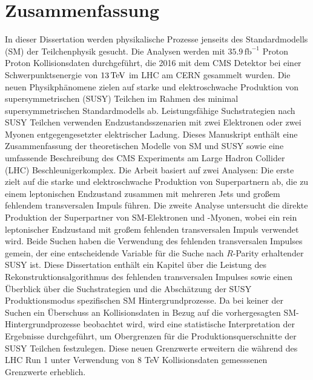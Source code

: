 \chapter*{Zusammenfassung}
\noindent
\justify
In dieser Dissertation werden physikalische Prozesse jenseits des Standardmodells (SM) der Teilchenphysik gesucht. 
Die Analysen werden mit $35.9\,\mathrm{fb^{-1}}$ Proton Proton Kollisionsdaten durchgef\"{u}hrt, die 2016 mit dem CMS Detektor bei einer Schwerpunktsenergie von $13\,\text{Te\hspace{-.08em}V}$ im LHC am CERN gesammelt wurden. 
Die neuen Physikph\"{a}nomene zielen auf starke und elektroschwache Produktion von supersymmetrischen (SUSY) Teilchen im Rahmen des minimal supersymmetrischen Standardmodells ab. 
Leistungsf\"{a}hige Suchstrategien nach SUSY Teilchen verwenden Endzustandsszenarien mit zwei Elektronen oder zwei Myonen entgegengesetzter elektrischer Ladung. 
\newpara
\noindent\justify
Dieses Manuskript enth\"{a}lt eine Zusammenfassung der theoretischen Modelle von SM und SUSY sowie eine umfassende Beschreibung des CMS Experiments am Large Hadron Collider (LHC) Beschleunigerkomplex. 
Die Arbeit basiert auf zwei Analysen: Die erste zielt auf die starke und elektroschwache Produktion von Superpartnern ab, die zu einem leptonischen Endzustand zusammen mit mehreren Jets und gro{\ss}em fehlendem transversalen Impuls f\"{u}hren. 
Die zweite Analyse untersucht die direkte Produktion der Superpartner von SM-Elektronen und -Myonen, wobei ein rein leptonischer Endzustand mit gro{\ss}em fehlenden transversalen Impuls verwendet wird.
Beide Suchen haben die Verwendung des fehlenden transversalen Impulses gemein, der eine entscheidende Variable f\"{u}r die Suche nach $R$-Parity erhaltender SUSY ist. 
\newpara
\noindent\justify
Diese Dissertation enth\"{a}lt ein Kapitel \"{u}ber die Leistung des Rekonstruktionsalgorithmus des fehlenden transversalen Impulses sowie einen \"{U}berblick \"{u}ber die Suchstrategien und die Absch\"{a}tzung der SUSY Produktionsmodus spezifischen SM Hintergrundprozesse.
\newpara
\noindent\justify
Da bei keiner der Suchen ein \"{U}berschuss an Kollisionsdaten in Bezug auf die vorhergesagten SM-Hintergrundprozesse beobachtet wird, wird eine statistische Interpretation der Ergebnisse durchgef\"{u}hrt, um Obergrenzen f\"{u}r die Produktionsquerschnitte der SUSY Teilchen festzulegen. 
Diese neuen Grenzwerte erweitern die w\"{a}hrend des LHC Run 1 unter Verwendung von 8 TeV Kollisionsdaten gemesssenen Grenzwerte erheblich. 
